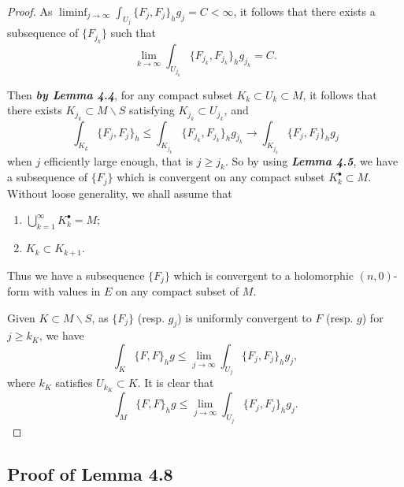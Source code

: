 \documentclass[twoside,openany,12pt]{beautynote}
\newcommand{\itbf}[1]{\textbf{\itshape #1}}\newcommand{\supp}{\operatorname{Supp}}\newcommand{\xu}{\sqrt{-1}}
\begin{document}
\begin{proof}
  As $\displaystyle\liminf_{j\to\infty}\int_{U_j}\{F_j,F_j\}_h g_j=C<\infty$, it follows that there exists a subsequence of $\{F_{j_k}\}$ such that \[\lim_{k\to\infty}\int_{U_{j_k}}\{F_{j_k},F_{j_k}\}_h g_{j_k}=C.\]

  Then \itbf{by Lemma 4.4}, for any compact subset $K_k\subset U_k\subset M$, it follows that there exists $K_{j_k}\subset M\backslash S$ satisfying $K_{j_k}\subset U_{j_k}$, and 
  \[
    \int_{K_k}\{F_j,F_j\}_h \leqslant \int_{K_{j_k}} \{F_{j_k},F_{j_k}\}_h g_{j_k} \to \int_{K_{j_k}} \{F_{j},F_{j}\}_h g_{j} 
  \]
  when $j$ efficiently large enough, that is $j\geqslant j_k$. So by using \itbf{Lemma 4.5}, we have a subsequence of $\{F_j\}$ which is convergent on any compact subset $K^\bullet_k \subset M$. Without loose generality, we shall assume that 
  \begin{enumerate}
    \item $\bigcup_{k=1}^\infty K_k^\bullet=M$;
    \item $K_k\subset K_{k+1}$.
  \end{enumerate}
Thus we have a subsequence $\{F_j\}$ which is convergent to a holomorphic $(n,0)$-form with values in $E$ on any compact subset of $M$.

Given $K\subset M\backslash S$, as $\{F_j\}$ (resp. $g_j$) is uniformly convergent to $F$ (resp. $g$) for $j\geqslant k_K$, we have 
\[
  \int_K \{F,F\}_h g\leqslant \lim_{j\to\infty} \int_{U_j} \{F_j,F_j\}_h g_j, 
\]
where $k_K$ satisfies $U_{k_K}\subset K$. It is clear that 
\[
  \int_M \{F,F\}_h g\leqslant \lim_{j\to\infty} \int_{U_j} \{F_j,F_j\}_h g_j.
\]

\end{proof}
  
\subsection{Proof of Lemma 4.8}
\end{document}
